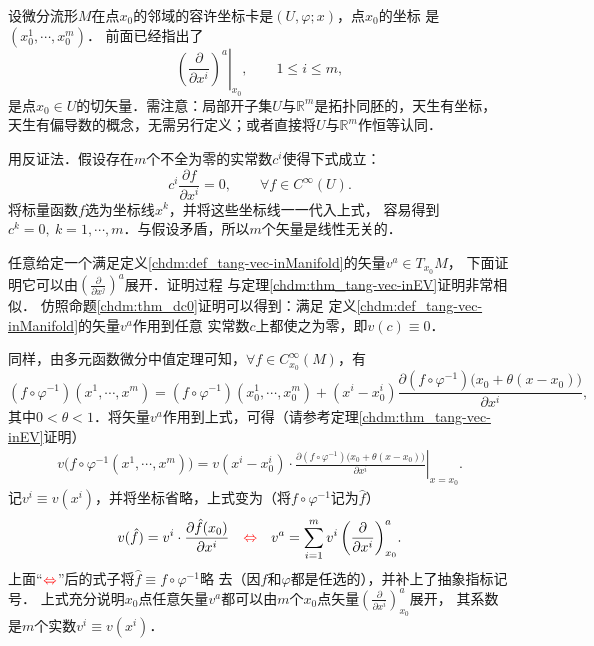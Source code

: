 
设微分流形$M$在点$x_0$的邻域的容许坐标卡是$(U,\varphi;x)$，点$x_0$的坐标
是$(x^1_0,\cdots,x^m_0)$．%
前面已经指出了
\begin{equation}
    \left. \left(\frac{\partial }{\partial x^i}\right)^a \right|_{x_0}, \qquad 1\leqslant i \leqslant m,
\end{equation}
是点$x_{0}\in U$的切矢量．需注意：局部开子集$U$与$\mathbb{R}^m$是拓扑同胚的，天生有坐标，
天生有偏导数的概念，无需另行定义；或者直接将$U$与$\mathbb{R}^m$作恒等认同．

用反证法．假设存在$m$个不全为零的实常数$c^i$使得下式成立：
\begin{equation}
    c^i \frac{\partial f}{\partial x^i}  =0, \qquad \forall f \in C^\infty(U).
\end{equation}
将标量函数$f$选为坐标线$x^k$，并将这些坐标线一一代入上式，
容易得到$c^k=0,\ k=1,\cdots,m$．与假设矛盾，所以$m$个矢量是线性无关的．

任意给定一个满足定义\ref{chdm:def_tang-vec-inManifold}的矢量$v^a\in T_{x_0}M$，
下面证明它可以由$(\frac{\partial }{\partial x^j})^a$展开．证明过程
与定理\ref{chdm:thm_tang-vec-inEV}证明非常相似．
仿照命题\ref{chdm:thm_dc0}证明可以得到：满足
定义\ref{chdm:def_tang-vec-inManifold}的矢量$v^a$作用到任意
实常数$c$上都使之为零，即$v(c)\equiv 0$．

同样，由多元函数微分中值定理可知，$\forall f\in C_{x_0}^\infty(M)$，有
\begin{equation*} %
    (f \circ\varphi^{-1})(x^1,\cdots,x^m)=(f \circ\varphi^{-1})(x^1_0,\cdots,x^m_0)+ 
    (x^i-x^i_0) \frac{\partial (f \circ\varphi^{-1}) \bigl(x_0+\theta(x-x_0) \bigr)}{\partial x^i},
\end{equation*}  %
其中$0<\theta<1$．将矢量$v^a$作用到上式，可得（请参考定理\ref{chdm:thm_tang-vec-inEV}证明）
\begin{align*} %
    v\bigl( f \circ\varphi^{-1} (x^1,\cdots,x^m)\bigr) = v(x^i-x^i_0) \cdot      \left.
     \frac{\partial (f \circ\varphi^{-1}) \bigl(x_0+\theta(x-x_0) \bigr)}{\partial x^i}\right|_{x=x_0}.
\end{align*}
记$v^i\equiv v(x^i)$，并将坐标省略，上式变为（将$f \circ\varphi^{-1}$记为$\hat{f}$）
\begin{equation}\label{chdm:eqn_v-expand-on-natural-bases}
    v( \hat{f} ) = v^i \cdot 
    \frac{\partial \hat{f} (x_0)}{\partial x^i}
    {\quad \color{red}\Leftrightarrow \quad }
    v^a = \sum_{i=1}^{m} { v^i \left(\frac{\partial }{\partial x^i}\right)^a_{x_0} }.
\end{equation}
上面“${ \color{red}\Leftrightarrow }$”后的式子将$\hat{f}\equiv f \circ\varphi^{-1} $略
去（因$f$和$\varphi$都是任选的），并补上了抽象指标记号．
上式充分说明$x_0$点任意矢量$v^a$都可以由$m$个$x_0$点矢量$(\frac{\partial }{\partial x^i})^a_{x_0} $展开，
其系数是$m$个实数$v^i\equiv v(x^i)$．

